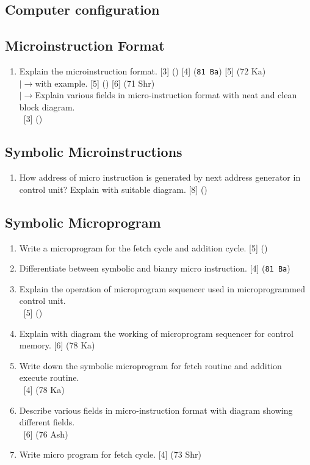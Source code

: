 \documentclass[12pt]{article}
\newcommand{\lb}{\\$\left|\rightarrow\right.$}
\newcommand{\enter}{\\\textcolor{white}{1}}
\begin{document}
	\subsection{Computer configuration}
	
	\subsection{Microinstruction Format}
		\begin{enumerate}[noitemsep, topsep=0pt]
			\item Explain the microinstruction format.  \hfill [3] () [4] (\texttt{81 Ba}) [5] (72 Ka)
			\lb with example. \hfill [5] () [6] (71 Shr)
			\lb Explain various fields in micro-instruction format with neat and clean block diagram.
			\enter\hfill [3] ()
		\end{enumerate}
		
	\subsection{Symbolic Microinstructions}
		\begin{enumerate}[noitemsep, topsep=0pt]
			\item How address of micro instruction is generated by next address generator in control unit? Explain with suitable diagram. \hfill [8] ()
		\end{enumerate}
	
	\subsection{Symbolic Microprogram}
		\begin{enumerate}[noitemsep, topsep=0pt]
			\item Write a microprogram for the fetch cycle and addition cycle. \hfill [5] ()
			
			\item Differentiate between symbolic and bianry micro instruction. \hfill [4] (\texttt{81 Ba})
			
			\item Explain the operation of microprogram sequencer used in microprogrammed control unit. 
			\enter\hfill [5] ()
			
			\item Explain with diagram the working of microprogram sequencer for control memory. \hfill [6] (78 Ka)
			
			\item Write down the symbolic microprogram for fetch routine and addition execute routine.
			\enter\hfill [4] (78 Ka)
			
			\item Describe various fields in micro-instruction format with diagram showing different fields.
			\enter\hfill [6] (76 Ash)
			
			\item Write micro program for fetch cycle. \hfill [4] (73 Shr)
		\end{enumerate}
		
\end{document}
